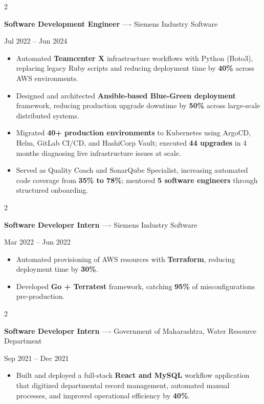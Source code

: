 \documentclass[10pt, letterpaper]{article}
\newenvironment{highlights}{
    \begin{itemize}[
        topsep=0.10 cm,
        parsep=0.06 cm,
        partopsep=0pt,
        itemsep=0.06 cm,
        leftmargin=12pt
    ]
}{
    \end{itemize}
}
\newenvironment{twocolentry}[2][]{
    \onecolentry
    \def\secondColumn{#2}
    \setcolumnwidth{\fill, 4.5 cm}
    \begin{paracol}{2}
}{
    \switchcolumn \raggedleft \secondColumn
    \end{paracol}
    \endonecolentry
}
\begin{document}
\vspace{0.15 cm}

\begin{twocolentry}{Jul 2022 -- Jun 2024}
\textbf{Software Development Engineer} ---- Siemens Industry Software
\end{twocolentry}
\begin{highlights}
  \item Automated \textbf{Teamcenter X} infrastructure workflows with Python (Boto3), replacing legacy Ruby scripts and reducing deployment time by \textbf{40\%} across AWS environments.
  \item Designed and architected \textbf{Ansible-based Blue-Green deployment} framework, reducing production upgrade downtime by \textbf{50\%} across large-scale distributed systems.
  \item Migrated \textbf{40+ production environments} to Kubernetes using ArgoCD, Helm, GitLab CI/CD, and HashiCorp Vault; executed \textbf{44 upgrades} in 4 months diagnosing live infrastructure issues at scale.
  \item Served as Quality Coach and SonarQube Specialist, increasing automated code coverage from \textbf{35\% to 78\%}; mentored \textbf{5 software engineers} through structured onboarding.
\end{highlights}

\vspace{0.15 cm}

\begin{twocolentry}{Mar 2022 -- Jun 2022}
\textbf{Software Developer Intern} ---- Siemens Industry Software
\end{twocolentry}
\begin{highlights}
  \item Automated provisioning of AWS resources with \textbf{Terraform}, reducing deployment time by \textbf{30\%}.
  \item Developed \textbf{Go + Terratest} framework, catching \textbf{95\%} of misconfigurations pre-production.
\end{highlights}

\vspace{0.15 cm}

\begin{twocolentry}{Sep 2021 -- Dec 2021}
\textbf{Software Developer Intern} ---- Government of Maharashtra, Water Resource Department
\end{twocolentry}
\begin{highlights}
  \item Built and deployed a full-stack \textbf{React and MySQL} workflow application that digitized departmental record management, automated manual processes, and improved operational efficiency by \textbf{40\%}.
\end{highlights}
\end{document}
